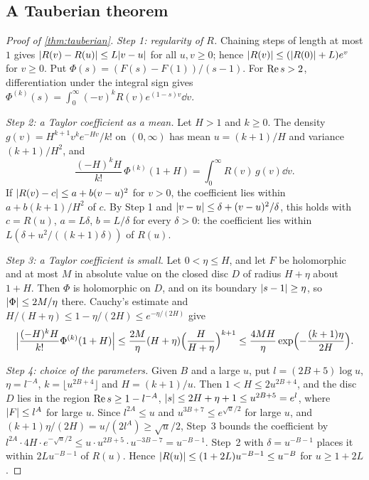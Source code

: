 \subsection{A Tauberian theorem}\label{ss:B-tauberian}

\begin{proof}[Proof of \cref{thm:tauberian}]
\emph{Step 1: regularity of $R$.} Chaining steps of length at most $1$ gives
$\lvert R(v)-R(u)\rvert\le L\lvert v-u\rvert$ for all $u,v\ge0$; hence $\lvert R(v)\rvert\le(\lvert R(0)\rvert+L)e^v$ for $v\ge0$.
Put $\Phi(s)=(F(s)-F(1))/(s-1)$. For $\operatorname{Re} s>2$, differentiation under the integral sign gives
$\Phi^{(k)}(s)=\int_0^\infty(-v)^kR(v)e^{(1-s)v}\dd v$.

\emph{Step 2: a Taylor coefficient as a mean.} Let $H>1$ and $k\ge0$. The density
$g(v)=H^{k+1}v^ke^{-Hv}/k!$ on $(0,\infty)$ has mean $u=(k+1)/H$ and variance $(k+1)/H^2$, and
\[
  \frac{(-H)^kH}{k!}\,\Phi^{(k)}(1+H)=\int_0^\infty R(v)\,g(v)\dd v.
\]
If $\lvert R(v)-c\rvert\le a+b(v-u)^2$ for $v>0$, the coefficient lies within $a+b(k+1)/H^2$ of $c$. By
Step 1 and $\lvert v-u\rvert\le\delta+(v-u)^2/\delta$, this holds with $c=R(u)$, $a=L\delta$, $b=L/\delta$
for every $\delta>0$: the coefficient lies within $L(\delta+u^2/((k+1)\delta))$ of $R(u)$.

\emph{Step 3: a Taylor coefficient is small.} Let $0<\eta\le H$, and let $F$ be holomorphic and at most
$M$ in absolute value on the closed disc $D$ of radius $H+\eta$ about $1+H$. Then $\Phi$ is holomorphic
on $D$, and on its boundary $\lvert s-1\rvert\ge\eta$, so $\lvert \Phi\rvert\le2M/\eta$ there. Cauchy's estimate and
$H/(H+\eta)\le1-\eta/(2H)\le e^{-\eta/(2H)}$ give
\[
  \Bigl\lvert\frac{(-H)^kH}{k!}\Phi^{(k)}(1+H)\Bigr\rvert
  \le\frac{2M}{\eta}(H+\eta)\Bigl(\frac{H}{H+\eta}\Bigr)^{k+1}
  \le\frac{4MH}{\eta}\exp\Bigl(-\frac{(k+1)\eta}{2H}\Bigr).
\]

\emph{Step 4: choice of the parameters.} Given $B$ and a large $u$, put $l=(2B+5)\log u$,
$\eta=l^{-A}$, $k=\lfloor u^{2B+4}\rfloor$ and $H=(k+1)/u$. Then $1<H\le2u^{2B+4}$, and the disc $D$
lies in the region $\operatorname{Re} s\ge1-l^{-A}$, $\lvert s\rvert\le2H+\eta+1\le u^{2B+5}=e^l$, where $\lvert F\rvert\le l^A$
for large $u$. Since $l^{2A}\le u$ and $u^{3B+7}\le e^{\sqrt u/2}$ for large $u$, and
$(k+1)\eta/(2H)=u/(2l^A)\ge\sqrt u/2$, Step~3 bounds the coefficient by
$l^{2A}\cdot4H\cdot e^{-\sqrt u/2}\le u\cdot u^{2B+5}\cdot u^{-3B-7}=u^{-B-1}$. Step~2 with
$\delta=u^{-B-1}$ places it within $2Lu^{-B-1}$ of $R(u)$. Hence $\lvert R(u)\rvert\le(1+2L)u^{-B-1}\le u^{-B}$
for $u\ge1+2L$.
\end{proof}

